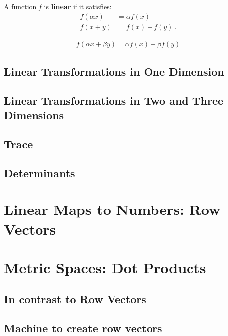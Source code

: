 \documentclass[12pt]{article}
\begin{document}

A function $f$ is \textbf{linear} if it satisfies:
\begin{align}
  f(\alpha x) &= \alpha f(x)\\
  f(x+y) &= f(x) + f(y) \ .
\end{align}

\begin{align}
  f(\alpha x + \beta y) = \alpha f(x)+\beta f(y)
  \label{eq:def:linear}
\end{align}



\subsection{Linear Transformations in One Dimension}

\subsection{Linear Transformations in Two and Three Dimensions}

\subsection{Trace}

\subsection{Determinants}

\section{Linear Maps to Numbers: Row Vectors}

\section{Metric Spaces: Dot Products}

\subsection{In contrast to Row Vectors}
\subsection{Machine to create row vectors}
\end{document}
